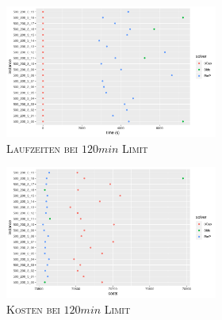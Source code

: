 \begin{figure}[H]
\begin{figure}[H]
\centering
\begin{subfigure}[b]{0.4\textwidth}
\centering
\includegraphics[width=1.3\textwidth]{img/solver_instance_time_b=3_l_7200s.png}
\caption{\textsc{Laufzeiten bei $120min$ Limit}}
\label{fig:b=3_l_runtimes}
\end{subfigure}
\hfill
\begin{subfigure}[b]{0.4\textwidth}
\centering
\includegraphics[width=1.3\textwidth]{img/solver_instance_cost_b=3_l_7200s.png}
\caption{\textsc{Kosten bei $120min$ Limit}}
\label{fig:b=3_l_costs}
\end{subfigure}
\caption{}
\label{fig:res_plots_b=3_l}
\end{figure}

\caption{}
\label{}
\end{figure}

